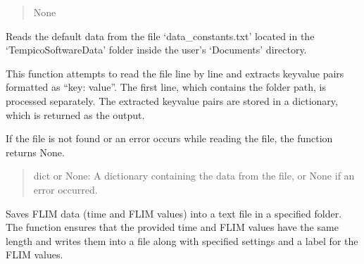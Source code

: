 \documentclass[letterpaper,10pt,english]{sphinxmanual}
\begin{document}
\begin{fulllineitems}
\begin{fulllineitems}
\begin{quote}
\begin{description}
\sphinxAtStartPar
None

\end{description}\end{quote}

\end{fulllineitems}


\begin{fulllineitems}
\label{\detokenize{createsavefile:createsavefile.createsavefile.read_default_data}}
\pysigstartsignatures
{}
\pysigstopsignatures
\sphinxAtStartPar
Reads the default data from the file ‘data\_constants.txt’ located in the 
‘TempicoSoftwareData’ folder inside the user’s ‘Documents’ directory.

\sphinxAtStartPar
This function attempts to read the file line by line and extracts key\sphinxhyphen{}value pairs 
formatted as “key: value”. The first line, which contains the folder path, is 
processed separately. The extracted key\sphinxhyphen{}value pairs are stored in a dictionary, 
which is returned as the output.

\sphinxAtStartPar
If the file is not found or an error occurs while reading the file, the function
returns None.
\begin{quote}\begin{description}
\sphinxAtStartPar
dict or None: A dictionary containing the data from the file, or None if 
an error occurred.

\end{description}\end{quote}

\end{fulllineitems}


\begin{fulllineitems}
\label{\detokenize{createsavefile:createsavefile.createsavefile.save_FLIM_data}}
\pysigstartsignatures
{}
\pysigstopsignatures
\sphinxAtStartPar
Saves FLIM data (time and FLIM values) into a text file in a specified folder. The function
ensures that the provided time and FLIM values have the same length and writes them into 
a file along with specified settings and a label for the FLIM values.


\end{fulllineitems}
\end{fulllineitems}
\end{document}
